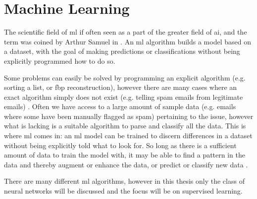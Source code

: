 \chapter{Machine Learning}
\label{sec:ml}
The scientific field of \acrfull{ml} if often seen as a part of the greater field of \acrfull{ai}\cite[3]{Alpaydin10}, and the term was coined by Arthur Samuel in \citeyear{samuelmachinelearning} \cite{samuelmachinelearning}. An \acrshort{ml} algorithm builds a model based on a dataset, with the goal of making predictions or classifications without being explicitly programmed how to do so. 

Some problems can easily be solved by programming an explicit algorithm (e.g. sorting a list, or \acrshort{fbp} reconstruction), however there are many cases where an exact algorithm simply does not exist (e.g. telling spam emails from legitimate emails) \cite[1]{Alpaydin10}. Often we have access to a large amount of sample data (e.g. emails where some have been manually flagged as spam) pertaining to the issue, however what is lacking is a suitable algorithm to parse and classify all the data. This is where \acrshort{ml} comes in: an \acrshort{ml} model can be trained to discern differences in a dataset without being explicitly told what to look for. So long as there is a sufficient amount of data to train the model with, it may be able to find a pattern in the data and thereby augment or enhance the data, or predict or classify new data \cite[2-4]{Alpaydin10}. 

There are many different \acrshort{ml} algorithms, however in this thesis only the class of neural networks will be discussed and the focus will be on supervised learning. 

